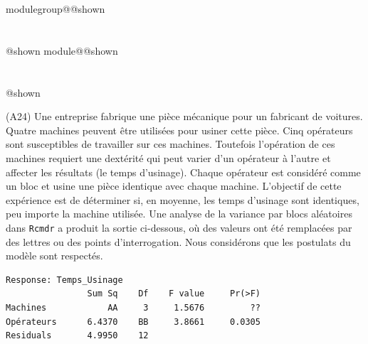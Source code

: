 \documentclass{Evaluation}
\makeatletter
\newcommand{\currentmodulekey}{}
\newcommand{\currentmoduletitle}{}
\newcommand{\currentgroupkey}{}
\newcommand{\currentgrouptitle}{}
\newcommand{\showmoduleifneeded}{%
  \ifx\currentgroupkey\empty\else
    \expandafter\ifx\csname modulegroup@\currentgroupkey @shown\endcsname\relax
      \section*{\currentgrouptitle}%
      \expandafter\gdef\csname modulegroup@\currentgroupkey @shown\endcsname{1}%
    \fi
  \fi
  \expandafter\ifx\csname module@\currentmodulekey @shown\endcsname\relax
    \section*{\currentmoduletitle}%
    \expandafter\gdef\csname module@\currentmodulekey @shown\endcsname{1}%
  \fi
}
\newenvironment{A24}{\showmoduleifneeded}{}
\makeatother
\begin{document}
\begin{questions}
\begin{A24}
\question
(A24) 
Une entreprise fabrique une pièce mécanique pour un fabricant de voitures. Quatre machines peuvent être utilisées pour usiner cette pièce. Cinq opérateurs sont susceptibles de travailler sur ces machines. Toutefois l'opération de ces machines requiert une  dextérité qui peut varier d'un opérateur à l'autre et affecter les résultats (le temps d'usinage). %
Chaque opérateur est considéré comme un bloc et usine une pièce identique avec chaque machine.
L'objectif de cette expérience est de déterminer si, en moyenne, les temps d'usinage sont identiques, peu importe la machine utilisée. Une analyse de la variance par blocs aléatoires dans \texttt{Rcmdr} a produit la sortie ci-dessous, où des valeurs ont été remplacées par des lettres ou des points d'interrogation. Nous considérons que les postulats 
 du modèle sont respectés.

\begin{verbatim}
Response: Temps_Usinage
                Sum Sq    Df    F value     Pr(>F)
Machines            AA     3     1.5676         ??
Opérateurs      6.4370    BB     3.8661     0.0305 
Residuals       4.9950    12
\end{verbatim}

\medskip

\end{A24}
\end{questions}
\end{document}
